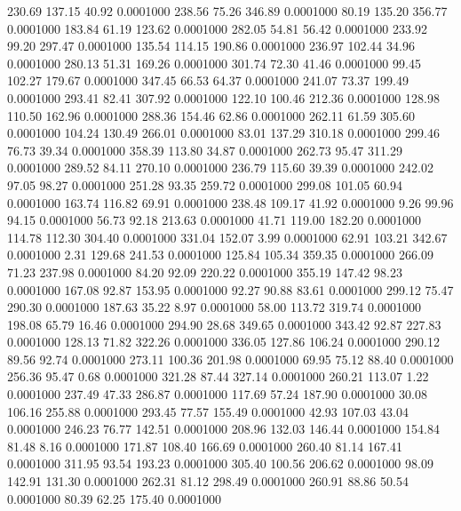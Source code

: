  230.69  137.15   40.92   0.0001000
 238.56   75.26  346.89   0.0001000
  80.19  135.20  356.77   0.0001000
 183.84   61.19  123.62   0.0001000
 282.05   54.81   56.42   0.0001000
 233.92   99.20  297.47   0.0001000
 135.54  114.15  190.86   0.0001000
 236.97  102.44   34.96   0.0001000
 280.13   51.31  169.26   0.0001000
 301.74   72.30   41.46   0.0001000
  99.45  102.27  179.67   0.0001000
 347.45   66.53   64.37   0.0001000
 241.07   73.37  199.49   0.0001000
 293.41   82.41  307.92   0.0001000
 122.10  100.46  212.36   0.0001000
 128.98  110.50  162.96   0.0001000
 288.36  154.46   62.86   0.0001000
 262.11   61.59  305.60   0.0001000
 104.24  130.49  266.01   0.0001000
  83.01  137.29  310.18   0.0001000
 299.46   76.73   39.34   0.0001000
 358.39  113.80   34.87   0.0001000
 262.73   95.47  311.29   0.0001000
 289.52   84.11  270.10   0.0001000
 236.79  115.60   39.39   0.0001000
 242.02   97.05   98.27   0.0001000
 251.28   93.35  259.72   0.0001000
 299.08  101.05   60.94   0.0001000
 163.74  116.82   69.91   0.0001000
 238.48  109.17   41.92   0.0001000
   9.26   99.96   94.15   0.0001000
  56.73   92.18  213.63   0.0001000
  41.71  119.00  182.20   0.0001000
 114.78  112.30  304.40   0.0001000
 331.04  152.07    3.99   0.0001000
  62.91  103.21  342.67   0.0001000
   2.31  129.68  241.53   0.0001000
 125.84  105.34  359.35   0.0001000
 266.09   71.23  237.98   0.0001000
  84.20   92.09  220.22   0.0001000
 355.19  147.42   98.23   0.0001000
 167.08   92.87  153.95   0.0001000
  92.27   90.88   83.61   0.0001000
 299.12   75.47  290.30   0.0001000
 187.63   35.22    8.97   0.0001000
  58.00  113.72  319.74   0.0001000
 198.08   65.79   16.46   0.0001000
 294.90   28.68  349.65   0.0001000
 343.42   92.87  227.83   0.0001000
 128.13   71.82  322.26   0.0001000
 336.05  127.86  106.24   0.0001000
 290.12   89.56   92.74   0.0001000
 273.11  100.36  201.98   0.0001000
  69.95   75.12   88.40   0.0001000
 256.36   95.47    0.68   0.0001000
 321.28   87.44  327.14   0.0001000
 260.21  113.07    1.22   0.0001000
 237.49   47.33  286.87   0.0001000
 117.69   57.24  187.90   0.0001000
  30.08  106.16  255.88   0.0001000
 293.45   77.57  155.49   0.0001000
  42.93  107.03   43.04   0.0001000
 246.23   76.77  142.51   0.0001000
 208.96  132.03  146.44   0.0001000
 154.84   81.48    8.16   0.0001000
 171.87  108.40  166.69   0.0001000
 260.40   81.14  167.41   0.0001000
 311.95   93.54  193.23   0.0001000
 305.40  100.56  206.62   0.0001000
  98.09  142.91  131.30   0.0001000
 262.31   81.12  298.49   0.0001000
 260.91   88.86   50.54   0.0001000
  80.39   62.25  175.40   0.0001000

